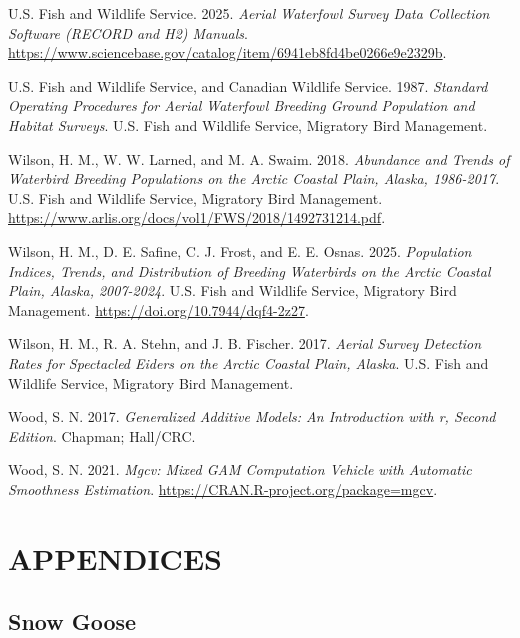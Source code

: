\documentclass[
]{article}
\newlength{\cslhangindent}
\newenvironment{CSLReferences}[2] %
 {\begin{list}{}{%
  \setlength{\itemindent}{0pt}
  \setlength{\leftmargin}{0pt}
  \setlength{\parsep}{0pt}
  \ifodd #1
   \setlength{\leftmargin}{\cslhangindent}
   \setlength{\itemindent}{-1\cslhangindent}
  \fi
  \setlength{\itemsep}{#2\baselineskip}}}
 {\end{list}}
\begin{document}
\begin{CSLReferences}{1}{1}
U.S. Fish and Wildlife Service. 2025. \emph{Aerial Waterfowl Survey Data
Collection Software (RECORD and H2) Manuals}.
\url{https://www.sciencebase.gov/catalog/item/6941eb8fd4be0266e9e2329b}.

U.S. Fish and Wildlife Service, and Canadian Wildlife Service. 1987.
\emph{Standard Operating Procedures for Aerial Waterfowl Breeding Ground
Population and Habitat Surveys}. {U.S. Fish and Wildlife Service},
{Migratory Bird Management}.

Wilson, H. M., W. W. Larned, and M. A. Swaim. 2018. \emph{Abundance and
Trends of Waterbird Breeding Populations on the Arctic Coastal Plain,
Alaska, 1986-2017}. {U.S. Fish and Wildlife Service}, {Migratory Bird
Management}.
\url{https://www.arlis.org/docs/vol1/FWS/2018/1492731214.pdf}.

Wilson, H. M., D. E. Safine, C. J. Frost, and E. E. Osnas. 2025.
\emph{Population Indices, Trends, and Distribution of Breeding
Waterbirds on the Arctic Coastal Plain, Alaska, 2007-2024}. {U.S. Fish
and Wildlife Service}, {Migratory Bird Management}.
\url{https://doi.org/10.7944/dqf4-2z27}.

Wilson, H. M., R. A. Stehn, and J. B. Fischer. 2017. \emph{Aerial Survey
Detection Rates for Spectacled Eiders on the Arctic Coastal Plain,
Alaska}. {U.S. Fish and Wildlife Service}, {Migratory Bird Management}.

Wood, S. N. 2017. \emph{Generalized Additive Models: An Introduction
with r, Second Edition}. Chapman; Hall/CRC.

Wood, S. N. 2021. \emph{Mgcv: Mixed GAM Computation Vehicle with
Automatic Smoothness Estimation}.
\url{https://CRAN.R-project.org/package=mgcv}.

\end{CSLReferences}

\newpage{}

\section*{APPENDICES}\label{appendices}

\subsection*{Snow Goose}\label{snow-goose}
\end{document}
